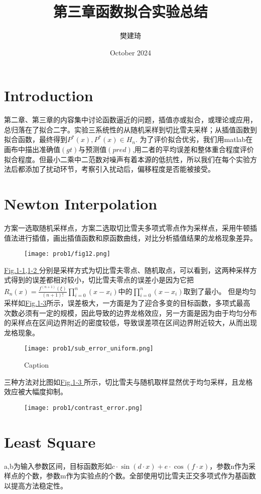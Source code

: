 \documentclass{article}
\title{第三章函数拟合实验总结}
\author{樊建琦}
\date{October 2024}
\begin{document}
\maketitle

\section{Introduction}
第二章、第三章的内容集中讨论函数逼近的问题，插值亦或拟合，或理论或应用，总归落在了拟合二字。实验三系统性的从随机采样到切比雪夫采样；从插值函数到拟合函数，最终得到$P^{*}(x),P^{*}(x) \in H_{n}$. 为了评价拟合优劣，我们用matlab在画布中描出准确值$(gt)$与预测值$(pred)$,用二者的平均误差和整体重合程度评价拟合程度。但最小二乘中二范数对噪声有着本源的低抗性，所以我们在每个实验方法后都添加了扰动环节，考察引入扰动后，偏移程度是否能被接受。
\section{Newton Interpolation}
方案一选取随机采样点，方案二选取切比雪夫多项式零点作为采样点，采用牛顿插值法进行插值，画出插值函数和原函数曲线，对比分析插值结果的龙格现象差异。
\begin{figure}
    \centering
    \texttt{[image: prob1/fig12.png]}
    \label{fig:cheb_random}
\end{figure}
\hyperref[fig:cheb_random]{Fig.1-1,1-2 }分别是采样方式为切比雪夫零点、随机取点，可以看到，这两种采样方式得到的误差都相对较小，切比雪夫零点的误差小是因为它把$R_n(x) = \frac{f^{(n+1)}(\xi)}{(n+1)!} \prod_{i=0}^{n} (x - x_i)$中的$\prod_{i=0}^{n} (x - x_i)$取到了最小。
但是均匀采样如\hyperref[fig:uniform]{Fig.1-3}所示，误差极大，一方面是为了迎合多变的目标函数，多项式最高次数必须有一定的规模，因此导致的边界龙格效应，另一方面是因为由于均匀分布的采样点在区间边界附近的密度较低，导致误差项在区间边界附近较大，从而出现龙格现象。 
\begin{figure}[H]
    \centering
    \texttt{[image: prob1/sub\_error\_uniform.png]}
    \caption{Caption}
    \label{fig:uniform}
\end{figure}
三种方法对比图如\hyperref[fig:contrast]{Fig.1-3 }所示，切比雪夫与随机取样显然优于均匀采样，且龙格效应被大幅度抑制。
\begin{figure}[H]
    \centering
    \texttt{[image: prob1/contrast\_error.png]}
    \label{fig:contrast}
\end{figure}
\clearpage

\section{Least Square}
a,b为输入参数区间，目标函数形如$c \cdot \sin(d \cdot x) + e \cdot \cos(f \cdot x)$，参数n作为采样点的个数，参数m作为实验点的个数。全部使用切比雪夫正交多项式作为基函数以提高方法稳定性。
\end{document}
